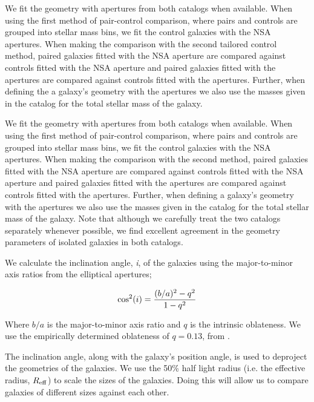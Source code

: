 \documentclass[iop,revtex4,twocolumn,apj,numberedappendix,appendixfloats]{emulateapj}
\newcommand{\reff}{$R_{\rm eff}$}
\begin{document}
We fit the geometry with apertures from both catalogs when available. When using the first method of pair-control comparison, where pairs and controls are grouped into stellar mass bins, we fit the control galaxies with the NSA apertures. When making the comparison with the second tailored control method, paired galaxies fitted with the NSA aperture are compared against controls fitted with the NSA aperture and paired galaxies fitted with the \citet{Simard:2011} apertures are compared against controls fitted with the \citet{Simard:2011} apertures. Further, when defining the a galaxy's geometry with the \citet{Simard:2011} apertures we also use the masses given in the catalog for the total stellar mass of the galaxy.

We fit the geometry with apertures from both catalogs when available. When using the first method of pair-control comparison, where pairs and controls are grouped into stellar mass bins, we fit the control galaxies with the NSA apertures. When making the comparison with the second method, paired galaxies fitted with the NSA aperture are compared against controls fitted with the NSA aperture and paired galaxies fitted with the \citet{Simard:2011} apertures are compared against controls fitted with the \citet{Simard:2011} apertures. Further, when defining a galaxy's geometry with the \citet{Simard:2011} apertures we also use the masses given in the catalog for the total stellar mass of the galaxy. Note that although we carefully treat the two catalogs separately whenever possible, we find excellent agreement in the geometry parameters of isolated galaxies in both catalogs.

We calculate the inclination angle, {\it i}, of the galaxies using the major-to-minor axis ratios from the elliptical apertures;

\begin{equation}
{\rm cos^2}(i) = \frac{(b/a)^2 - q^2}{1 - q^2}
\end{equation}

Where $b/a$ is the major-to-minor axis ratio and $q$ is the intrinsic oblateness. We use the empirically determined oblateness of $q = 0.13$, from \citet{Giovanelli:1994}.

The inclination angle, along with the galaxy's position angle, is used to deproject the geometries of the galaxies. We use the 50\% half light radius (i.e. the effective radius, \reff) to scale the sizes of the galaxies. Doing this will allow us to compare galaxies of different sizes against each other.
\end{document}
